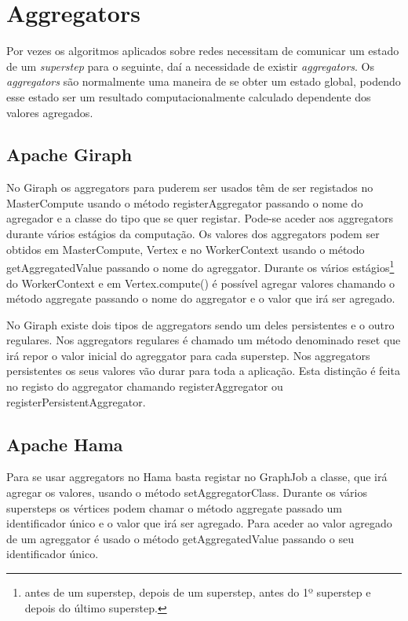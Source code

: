 \newpage

\section{Aggregators}
  Por vezes os algoritmos aplicados sobre redes necessitam de comunicar um estado de um \textit{superstep} para o seguinte, daí a necessidade de existir \textit{aggregators}. Os \textit{aggregators} são normalmente uma maneira de se obter um estado global, podendo esse estado ser um resultado computacionalmente calculado dependente dos valores agregados.
  \subsection*{Apache Giraph}
    No Giraph os aggregators para puderem ser usados têm de ser registados no MasterCompute usando o método registerAggregator
    passando o nome do agregador e a classe do tipo que se quer registar. Pode-se aceder aos aggregators durante vários estágios da computação.
    Os valores dos aggregators podem ser obtidos em MasterCompute, Vertex e no WorkerContext usando o método getAggregatedValue passando
    o nome do agreggator.
    Durante os vários estágios\footnote{antes de um superstep, depois de um superstep, 
    antes do 1º superstep e depois do último superstep.} do WorkerContext e em Vertex.compute() é possível agregar valores chamando o método
    aggregate passando o nome do aggregator e o valor que irá ser agregado.
    
    No Giraph existe dois tipos de aggregators sendo um deles persistentes e o outro regulares. Nos aggregators regulares é chamado um método
    denominado reset que irá repor o valor inicial do agreggator para cada superstep. Nos aggregators persistentes os seus valores vão durar
    para toda a aplicação. Esta distinção é feita no registo do aggregator chamando registerAggregator 
    ou registerPersistentAggregator.
    
  \subsection*{Apache Hama}
    Para se usar aggregators no Hama basta registar no GraphJob a classe, que irá agregar os valores, usando o método
    setAggregatorClass. Durante os vários supersteps os vértices podem chamar o método aggregate passado um identificador único
    e o valor que irá ser agregado. Para aceder ao valor agregado de um agreggator é usado o método getAggregatedValue passando o seu 
    identificador único.
    
